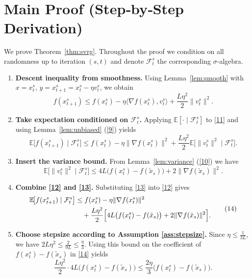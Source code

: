 \documentclass[11pt]{article}
\newcommand{\E}{\mathbb{E}}
\begin{document}
\newpage
\section*{Main Proof (Step‑by‑Step Derivation)}
We prove Theorem~\ref{thm:svrg}.  Throughout the proof we condition on all randomness up to iteration $(s,t)$ and denote $\mathcal{F}^{s}_t$ the corresponding $\sigma$‑algebra.

\begin{enumerate}[label=[Step \arabic*]]
\item \textbf{Descent inequality from smoothness.}  
Using Lemma~\ref{lem:smooth} with $x=x^{s}_t$, $y=x^{s}_{t+1}=x^{s}_t-\eta v^{s}_t$, we obtain
\[
f(x^{s}_{t+1})\le f(x^{s}_t)-\eta\langle\nabla f(x^{s}_t),v^{s}_t\rangle+\frac{L\eta^{2}}{2}\|v^{s}_t\|^{2}.
\tag{11}
\]

\item \textbf{Take expectation conditioned on $\mathcal{F}^{s}_t$.}  
Applying $\E[\cdot\mid\mathcal{F}^{s}_t]$ to \eqref{11} and using Lemma~\ref{lem:unbiased} (\eqref{9}) yields
\[
\E\!\bigl[f(x^{s}_{t+1})\mid\mathcal{F}^{s}_t\bigr]\le
f(x^{s}_t)-\eta\|\nabla f(x^{s}_t)\|^{2}
+\frac{L\eta^{2}}{2}\E\!\bigl[\|v^{s}_t\|^{2}\mid\mathcal{F}^{s}_t\bigr].
\tag{12}
\]

\item \textbf{Insert the variance bound.}  
From Lemma~\ref{lem:variance} (\eqref{10}) we have
\[
\E\!\bigl[\|v^{s}_t\|^{2}\mid\mathcal{F}^{s}_t\bigr]
\le 4L\bigl(f(x^{s}_t)-f(\tilde{x}_s)\bigr)+2\|\nabla f(\tilde{x}_s)\|^{2}.
\tag{13}
\]

\item \textbf{Combine \eqref{12} and \eqref{13}.}  
Substituting \eqref{13} into \eqref{12} gives
\[
\begin{aligned}
\E\!\bigl[f(x^{s}_{t+1})\mid\mathcal{F}^{s}_t\bigr]
&\le f(x^{s}_t)-\eta\|\nabla f(x^{s}_t)\|^{2}\\
&\quad+\frac{L\eta^{2}}{2}\Bigl[4L\bigl(f(x^{s}_t)-f(\tilde{x}_s)\bigr)+2\|\nabla f(\tilde{x}_s)\|^{2}\Bigr].
\end{aligned}
\tag{14}
\]

\item \textbf{Choose stepsize according to Assumption \ref{ass:stepsize}.}  
Since $\eta\le\frac1{3L}$, we have $2L\eta^{2}\le\frac{2}{9L}\le\frac{\eta}{3}$.  Using this bound on the coefficient of $f(x^{s}_t)-f(\tilde{x}_s)$ in \eqref{14} yields
\[
\frac{L\eta^{2}}{2}\cdot4L\bigl(f(x^{s}_t)-f(\tilde{x}_s)\bigr)
\le \frac{2\eta}{3}\bigl(f(x^{s}_t)-f(\tilde{x}_s)\bigr).
\tag{15}
\]


\end{enumerate}
\end{document}

